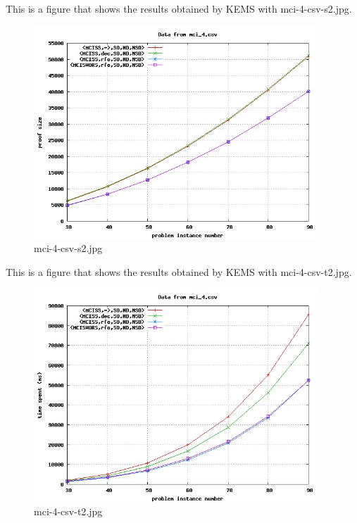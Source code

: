 This is a figure that shows the results obtained by KEMS with mci-4-csv-s2.jpg.
\begin{figure}[htbp]
\begin{center}
\includegraphics[width=0.95\textwidth]{figuras/mci-4-csv-s2.jpg}
\end{center}
\caption{mci-4-csv-s2.jpg}
\end{figure}

This is a figure that shows the results obtained by KEMS with mci-4-csv-t2.jpg.
\begin{figure}[htbp]
\begin{center}
\includegraphics[width=0.95\textwidth]{figuras/mci-4-csv-t2.jpg}
\end{center}
\caption{mci-4-csv-t2.jpg}
\end{figure}

